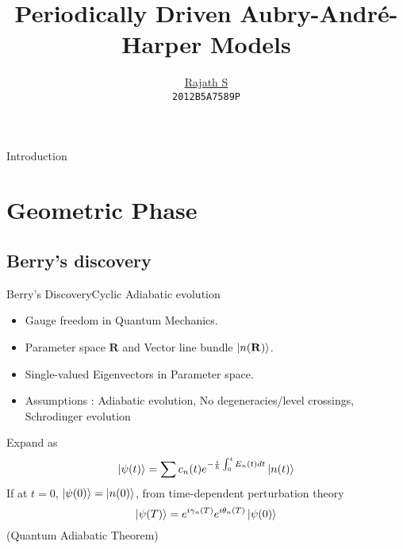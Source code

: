 \documentclass{beamer}
\title{Periodically Driven Aubry-Andr\'{e}-Harper Models}
\author{\href{mailto:rajath.shashidhara@gmail.com}{Rajath S} \\ \texttt{2012B5A7589P}}
\institute[Birla Institute of Technology and Science, Pilani] %
{
  \tiny Under the supervision of \\  
  \normalsize Dr. Tapomoy Guha Sarkar\\ 
  \footnotesize Department of Physics\\
  Birla Institute of Technology and Science, Pilani\\ \normalsize
  \texttt{[image: logo.png]}\\
  }
\begin{document}
\begin{frame}
  \titlepage
\end{frame}

\begin{frame}{Introduction}
  \begin{multicols}{2}
    \tableofcontents
  \end{multicols}
\end{frame}

\section{Geometric Phase}

\subsection{Berry's discovery}

\begin{frame}{Berry's Discovery}{Cyclic Adiabatic evolution}
  \begin{itemize}
  \item {
    Gauge freedom in Quantum Mechanics.
  }
  \item {
    Parameter space $\mathbf{R}$ and Vector line bundle $\ket{n(\mathbf{R})}$.
  }
  \item{
    Single-valued Eigenvectors in Parameter space.
  }
  \item {
    Assumptions : Adiabatic evolution, No degeneracies/level crossings, Schrodinger evolution
  }  
  \end{itemize}  
  Expand as \begin{equation*}
             \ket{\psi(t)} = \sum{c_{n}(t) e^{-\frac{i}{\hbar}\int_{0}^{t}{E_{n}(t) dt}} \ket{n(t)}}
            \end{equation*}
  If at $t=0$, $\ket{\psi(0)} = \ket{n(0)}$, from time-dependent perturbation theory
  \begin{equation*}
    \ket{\psi(T)} = e^{i \gamma_{n}(T)} e^{i \theta_{n}(T)} \ket{\psi(0)}
  \end{equation*} (Quantum Adiabatic Theorem)
\end{frame}
\end{document}
